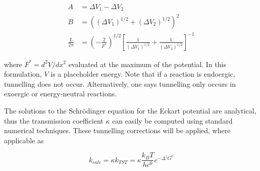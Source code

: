 \begin{doublespace}
\begin{align}
  A &= \Delta V_1 - \Delta V_2 \\
  B &= ((\Delta V_1)^{1/2} + (\Delta V_2)^{1/2})^2 \\
 \frac{L}{2\pi} &= (-\frac{2}{F^*})^{1/2} [\frac{1}{(\Delta V_1)^{1/2}} +
      \frac{1}{(\Delta V_2)^{1/2}}]^{-1}
\end{align}

\noindent where $F^* = d^2V/dx^2$ evaluated at the maximum of the potential. In
this formulation, $V$ is a placeholder energy. Note that if a reaction is
endoergic, tunnelling does not occur. Alternatively, one says tunnelling only
occurs in exoergic or energy-neutral reactions.

The solutions to the Schr{\"o}dinger equation for the Eckart potential are
analytical, thus the transmission coefficient $\kappa$ can easily be computed
using standard numerical techniques. These tunnelling corrections will be
applied, where applicable as

\begin{equation}
  k_{calc} = \kappa k_{TST} = \kappa
\frac{k_B T}{hc^0}e^{-\Delta^\ddagger G^0}
\end{equation}

\end{doublespace}
